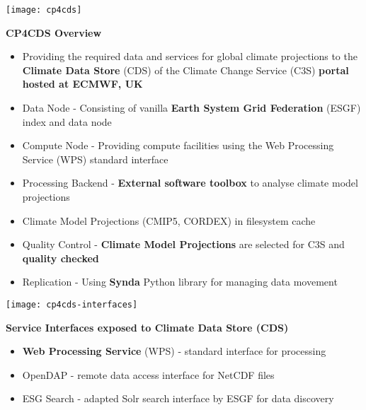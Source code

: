 \documentclass[landscape,a0paper,fontscale=0.4]{baposter} %
\newcommand{\compresslist}{%
\setlength{\itemsep}{1pt}%
\setlength{\parskip}{0pt}%
\setlength{\parsep}{0pt}%
}
\begin{document}
\begin{poster}
{   \begin{minipage}{0.4\textwidth}
     \texttt{[image: cp4cds]}
   \end{minipage}
   \begin{minipage}{0.6\textwidth}
     {\bf CP4CDS Overview}
     \begin{itemize}\compresslist
       \item Providing the required data and services for global climate projections
        to the {\bf Climate Data Store} (CDS) of the
        Climate Change Service (C3S) {\bf portal hosted at ECMWF, UK}
       \item Data Node - Consisting of vanilla {\bf Earth System Grid Federation} (ESGF) index and data node
       \item Compute Node - Providing compute facilities using the Web Processing Service (WPS) standard interface
       \item Processing Backend - {\bf External software toolbox} to analyse climate model projections
       \item Climate Model Projections (CMIP5, CORDEX) in filesystem cache
       \item Quality Control - {\bf Climate Model Projections} are selected for C3S and {\bf quality checked}
       \item Replication - Using {\bf Synda} Python library for managing data movement
     \end{itemize}
  \end{minipage}

  \begin{minipage}{0.4\textwidth}
    \texttt{[image: cp4cds-interfaces]}
  \end{minipage}
  \begin{minipage}{0.6\textwidth}
    {\bf Service Interfaces exposed to Climate Data Store (CDS)}
    \begin{itemize}\compresslist
      \item {\bf Web Processing Service} (WPS) - standard interface for processing
      \item OpenDAP - remote data access interface for NetCDF files
      \item ESG Search - adapted Solr search interface by ESGF for data discovery
    \end{itemize}
 \end{minipage}

}
\end{poster}
\end{document}
